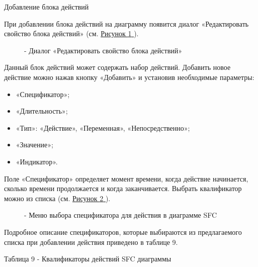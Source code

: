 \documentclass[letterpaper,10pt,russian]{sphinxmanual}
\begin{document}
Добавление блока действий

При добавлении блока действий на диаграмму появится диалог
«Редактировать свойство блока действий» (см. \hyperref[usage_guide/ide_components:image99]{Рисунок \ref{usage_guide/ide_components:image99} }).
\begin{figure}[htbp]
\centering
\capstart

\noindent{}
\caption{- Диалог «Редактировать свойство блока действий»}\label{usage_guide/ide_components:image99}\end{figure}

Данный блок действий может содержать набор действий. Добавить новое
действие можно нажав кнопку «Добавить» и установив необходимые
параметры:
\begin{itemize}
\item {} 
«Спецификатор»;

\item {} 
«Длительность»;

\item {} 
«Тип»: «Действие», «Переменная», «Непосредственно»;

\item {} 
«Значение»;

\item {} 
«Индикатор».

\end{itemize}

Поле «Спецификатор» определяет момент времени, когда действие
начинается, сколько времени продолжается и когда заканчивается. Выбрать
квалификатор можно из списка (см. \hyperref[usage_guide/ide_components:image100]{Рисунок \ref{usage_guide/ide_components:image100} }).
\begin{figure}[htbp]
\centering
\capstart

\noindent{}
\caption{- Меню выбора спецификатора для действия в диаграмме SFC}\label{usage_guide/ide_components:image100}\end{figure}

Подробное описание спецификаторов, которые выбираются из предлагаемого
списка при добавлении действия приведено в таблице 9.

Таблица 9 - Квалификаторы действий SFC диаграммы
\end{document}
